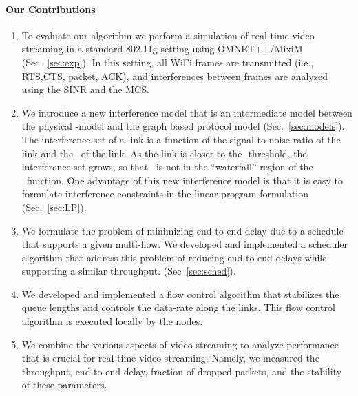 \documentclass[12pt]{article}
\newenvironment{proof sketch}[1]{\noindent {\emph{Proof sketch of #1:}}}{\hfill \qed}
\newcommand{\SINR}{\text{\sc{sinr}}}
\newcommand{\PER}{\text{\sc{per}}}
\newcommand{\mf}{\text{\emph{mf}}}
\newcommand{\MCS}{\text{\sc{mcs}}}
\begin{document}
\paragraph{Our Contributions}
\begin{enumerate}
\item To evaluate our algorithm we perform a simulation of real-time
  video streaming in a standard 802.11g setting using OMNET++/MixiM
  (Sec.~\ref{sec:exp}).  In this setting, all WiFi frames are
  transmitted (i.e., RTS,CTS, packet, ACK), and interferences between
  frames are analyzed using the SINR and the MCS.
\item We introduce a new interference model that is an intermediate
  model between the physical \SINR-model and the graph based protocol
  model (Sec.~\ref{sec:models}). The interference set of a link is a
  function of the signal-to-noise ratio of the link and the \MCS\ of
  the link.  As the link is closer to the \SINR-threshold, the
  interference set grows, so that \SINR\ is not in the ``waterfall''
  region of the \PER\ function.  One advantage of this new
  interference model is that it is easy to formulate interference
  constraints in the linear program formulation (Sec.~\ref{sec:LP}).
\item We formulate the problem of minimizing end-to-end delay due to a
  schedule that supports a given multi-flow. We developed and
  implemented a scheduler algorithm that address this problem of
  reducing end-to-end delays while supporting a similar throughput.
  (Sec~\ref{sec:sched}).
\item We developed and implemented a flow control algorithm that
  stabilizes the queue lengths and controls the data-rate along the
  links.  This flow control algorithm is executed locally by the
  nodes.
\item We combine the various aspects of video streaming to analyze
  performance that is crucial for real-time video streaming.  Namely,
  we measured the throughput, end-to-end delay, fraction of dropped
  packets, and the stability of these parameters.
\end{enumerate}

\end{document}
